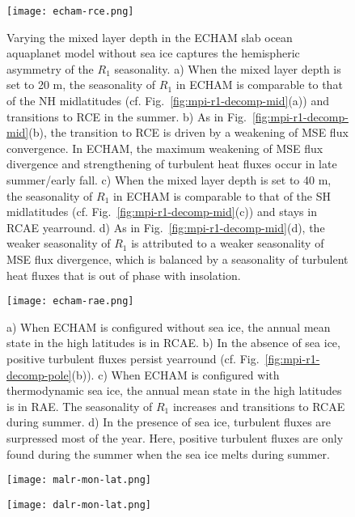 \documentclass{ametsocV5}
\begin{document}
\begin{figure}[t]
  \noindent\texttt{[image: echam-rce.png]}\\
  \caption{Varying the mixed layer depth in the ECHAM slab ocean aquaplanet model without sea ice captures the hemispheric asymmetry of the \(R_{1}\) seasonality. a) When the mixed layer depth is set to 20 m, the seasonality of \(R_{1}\) in ECHAM is comparable to that of the NH midlatitudes (cf. Fig.~\ref{fig:mpi-r1-decomp-mid}(a)) and transitions to RCE in the summer. b) As in Fig.~\ref{fig:mpi-r1-decomp-mid}(b), the transition to RCE is driven by a weakening of MSE flux convergence. In ECHAM, the maximum weakening of MSE flux divergence and strengthening of turbulent heat fluxes occur in late summer/early fall. c) When the mixed layer depth is set to 40 m, the seasonality of \(R_{1}\) in ECHAM is comparable to that of the SH midlatitudes (cf. Fig.~\ref{fig:mpi-r1-decomp-mid}(c)) and stays in RCAE yearround. d) As in Fig.~\ref{fig:mpi-r1-decomp-mid}(d), the weaker seasonality of \(R_{1}\) is attributed to a weaker seasonality of MSE flux divergence, which is balanced by a seasonality of turbulent heat fluxes that is out of phase with insolation.}
  \label{fig:echam-rce}
\end{figure}

\begin{figure}[t]
  \noindent\texttt{[image: echam-rae.png]}\\
  \caption{a) When ECHAM is configured without sea ice, the annual mean state in the high latitudes is in RCAE. b) In the absence of sea ice, positive turbulent fluxes persist yearround (cf. Fig.~\ref{fig:mpi-r1-decomp-pole}(b)). c) When ECHAM is configured with thermodynamic sea ice, the annual mean state in the high latitudes is in RAE. The seasonality of \(R_{1}\) increases and transitions to RCAE during summer. d) In the presence of sea ice, turbulent fluxes are surpressed most of the year. Here, positive turbulent fluxes are only found during the summer when the sea ice melts during summer.}
  \label{fig:echam-rae}
\end{figure}

\begin{figure}[t]
  \noindent\texttt{[image: malr-mon-lat.png]}\\
  \label{fig:malr-mon-lat}
\end{figure}

\begin{figure}[t]
  \noindent\texttt{[image: dalr-mon-lat.png]}\\
  \label{fig:dalr-mon-lat}
\end{figure}
\end{document}
